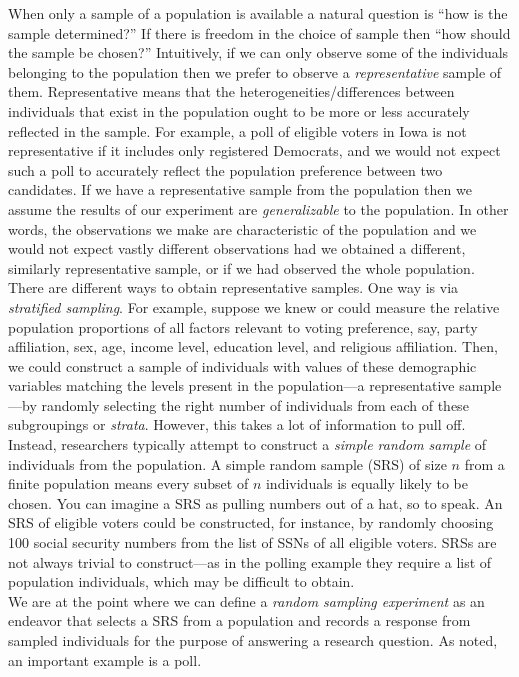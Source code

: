 \documentclass[
]{book}
\theoremstyle{definition}
\theoremstyle{definition}
\theoremstyle{definition}
\theoremstyle{definition}
\theoremstyle{remark}
\begin{document}
When only a sample of a population is available a natural question is ``how is the sample determined?'' If there is freedom in the choice of sample then ``how should the sample be chosen?'' Intuitively, if we can only observe some of the individuals belonging to the population then we prefer to observe a \emph{representative} sample of them. Representative means that the heterogeneities/differences between individuals that exist in the population ought to be more or less accurately reflected in the sample. For example, a poll of eligible voters in Iowa is not representative if it includes only registered Democrats, and we would not expect such a poll to accurately reflect the population preference between two candidates. If we have a representative sample from the population then we assume the results of our experiment are \emph{generalizable} to the population. In other words, the observations we make are characteristic of the population and we would not expect vastly different observations had we obtained a different, similarly representative sample, or if we had observed the whole population. There are different ways to obtain representative samples. One way is via \emph{stratified sampling}. For example, suppose we knew or could measure the relative population proportions of all factors relevant to voting preference, say, party affiliation, sex, age, income level, education level, and religious affiliation. Then, we could construct a sample of individuals with values of these demographic variables matching the levels present in the population---a representative sample---by randomly selecting the right number of individuals from each of these subgroupings or \emph{strata}. However, this takes a lot of information to pull off. Instead, researchers typically attempt to construct a \emph{simple random sample} of individuals from the population. A simple random sample (SRS) of size \(n\) from a finite population means every subset of \(n\) individuals is equally likely to be chosen. You can imagine a SRS as pulling numbers out of a hat, so to speak. An SRS of eligible voters could be constructed, for instance, by randomly choosing 100 social security numbers from the list of SSNs of all eligible voters. SRSs are not always trivial to construct---as in the polling example they require a list of population individuals, which may be difficult to obtain.\\

We are at the point where we can define a \emph{random sampling experiment} as an endeavor that selects a SRS from a population and records a response from sampled individuals for the purpose of answering a research question. As noted, an important example is a poll.
\end{document}

